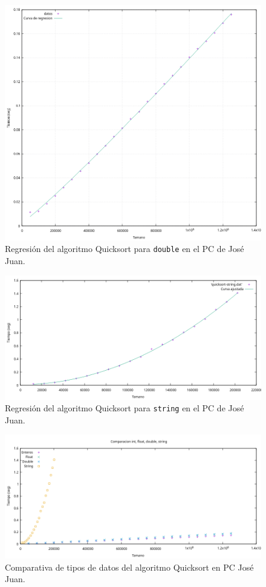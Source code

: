 \documentclass[12pt]{article}
\begin{document}
    \begin{figure}
        \centering
        \includegraphics[width=0.8\linewidth]{images/quicksort/graficas/quicksort-double-regresion.png}
        \cprotect\caption{Regresión del algoritmo Quicksort para \verb|double| en el PC de José Juan.}
        \label{fig:RegresionQuicksortDouble}
    \end{figure}
    \begin{figure}
        \centering
        \includegraphics[width=\linewidth]{images/quicksort/graficas/quicksort-string-regresion.png}
        \cprotect\caption{Regresión del algoritmo Quicksort para \verb|string| en el PC de José Juan.}
        \label{fig:RegresionQuicksortString}
    \end{figure}
    \begin{figure}
        \centering
        \includegraphics[width=\linewidth]{images/quicksort/graficas/Comparativa.png}
        \caption{Comparativa de tipos de datos del algoritmo Quicksort en PC José Juan.}
        \label{fig:QuicksortComparativaDatos}
    \end{figure}
\end{document}
